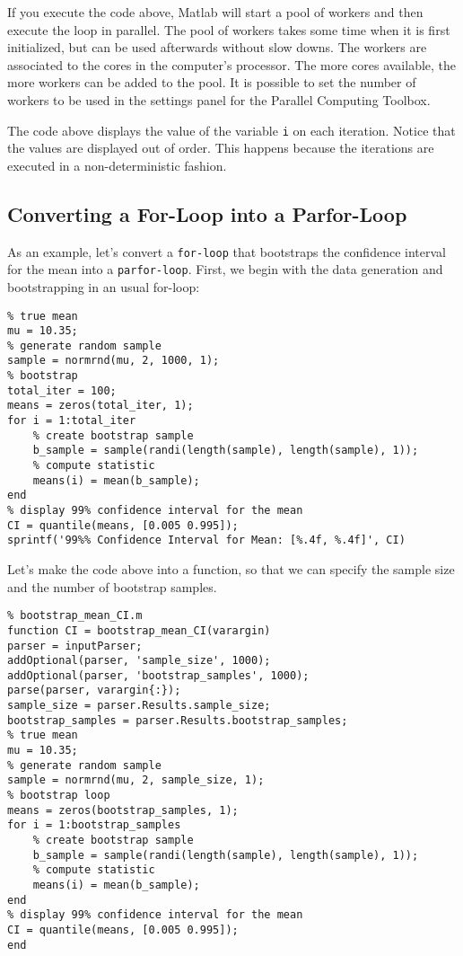 \documentclass[12pt, a4paper]{article}
\begin{document}
If you execute the code above, Matlab will start a pool of workers and then execute the loop in parallel.
The pool of workers takes some time when it is first initialized, but can be used afterwards without slow downs.
The workers are associated to the cores in the computer's processor.
The more cores available, the more workers can be added to the pool.
It is possible to set the number of workers to be used in the settings panel for the Parallel Computing Toolbox.

The code above displays the value of the variable \texttt{i} on each iteration.
Notice that the values are displayed out of order.
This happens because the iterations are executed in a non-deterministic fashion.

\subsection{Converting a For-Loop into a Parfor-Loop}
\label{sec:orgee1365d}
As an example, let's convert a \texttt{for-loop} that bootstraps the confidence interval for the mean into a \texttt{parfor-loop}.
First, we begin with the data generation and bootstrapping in an usual for-loop:
\lstset{language=matlab,label= ,caption= ,captionpos=b,firstnumber=1,numbers=left,style=Matlab-editor}
\begin{lstlisting}
% true mean
mu = 10.35;
% generate random sample
sample = normrnd(mu, 2, 1000, 1);
% bootstrap
total_iter = 100;
means = zeros(total_iter, 1);
for i = 1:total_iter
    % create bootstrap sample
    b_sample = sample(randi(length(sample), length(sample), 1));
    % compute statistic
    means(i) = mean(b_sample);
end
% display 99% confidence interval for the mean
CI = quantile(means, [0.005 0.995]);
sprintf('99%% Confidence Interval for Mean: [%.4f, %.4f]', CI)
\end{lstlisting}
Let's make the code above into a function, so that we can specify the sample size and the number of bootstrap samples.
\lstset{language=matlab,label= ,caption= ,captionpos=b,firstnumber=1,numbers=left,style=Matlab-editor}
\begin{lstlisting}
% bootstrap_mean_CI.m
function CI = bootstrap_mean_CI(varargin)
parser = inputParser;
addOptional(parser, 'sample_size', 1000);
addOptional(parser, 'bootstrap_samples', 1000);
parse(parser, varargin{:});
sample_size = parser.Results.sample_size;
bootstrap_samples = parser.Results.bootstrap_samples;
% true mean
mu = 10.35;
% generate random sample
sample = normrnd(mu, 2, sample_size, 1);
% bootstrap loop
means = zeros(bootstrap_samples, 1);
for i = 1:bootstrap_samples
    % create bootstrap sample
    b_sample = sample(randi(length(sample), length(sample), 1));
    % compute statistic
    means(i) = mean(b_sample);
end
% display 99% confidence interval for the mean
CI = quantile(means, [0.005 0.995]);
end
\end{lstlisting}
\end{document}
